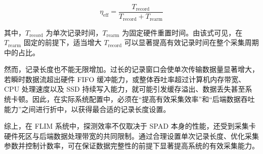 \begin{equation}
  \eta_{\mathrm{eff}} = \frac{T_{\mathrm{record}}}{T_{\mathrm{record}} + T_{\mathrm{rearm}}}
\end{equation}

其中，$T_{\mathrm{record}}$ 为单次记录时间，$T_{\mathrm{rearm}}$ 为固定硬件重置时间。由该式可见，在 $T_{\mathrm{rearm}}$ 固定的前提下，适当增大 $T_{\mathrm{record}}$ 可以显著提高有效记录时间在整个采集周期中的占比。

然而，记录长度也不能无限增加。过长的记录窗口会使单次传输数据量显著增大，若瞬时数据流超出硬件 FIFO 缓冲能力，或整体吞吐率超过计算机内存带宽、CPU 处理速度以及 SSD 持续写入能力，就可能引发缓存溢出、数据丢失甚至系统卡顿。因此，在实际系统配置中，必须在``提高有效采集效率''和``后端数据吞吐能力''之间进行折中，以获得最合适的记录长度设置。

综上，在 FLIM 系统中，探测效率不仅取决于 SPAD 本身的性能，还受到采集卡硬件死区与后端数据处理带宽的共同限制。通过合理设置单次记录长度、优化采集参数并控制计数率，可在保证数据完整性的前提下显著提高系统的有效采集能力。


